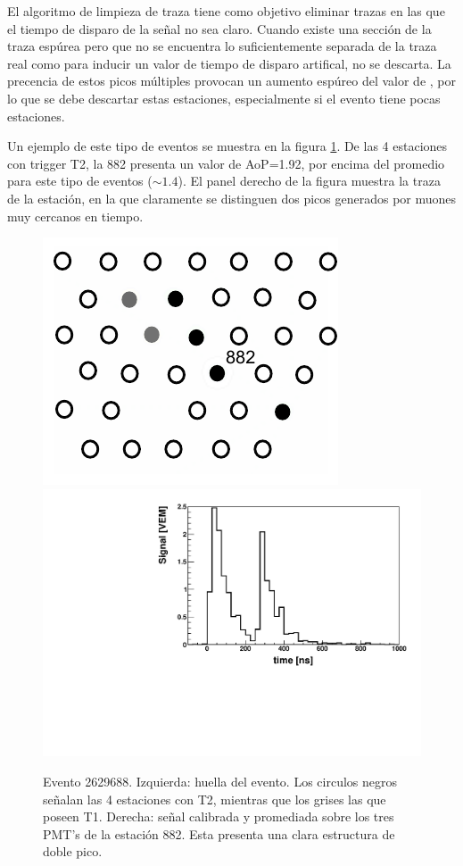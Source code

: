 	El algoritmo de limpieza de traza tiene como objetivo eliminar trazas en las que el tiempo de disparo de la señal no sea claro. 
	Cuando existe una sección de la traza espúrea pero que no se encuentra lo suficientemente separada de la traza real como para inducir un valor de tiempo de disparo artifical, no se descarta.
	La precencia de estos picos múltiples provocan un aumento espúreo del valor de \aop{}, por lo que se debe descartar estas estaciones, especialmente si el evento tiene pocas estaciones.
	
	Un ejemplo de este tipo de eventos se muestra en la figura \ref{fig:doublePeakEvent}.
	De las 4 estaciones con trigger T2, la 882 presenta un valor de AoP=1.92, por encima del promedio para este tipo de eventos ($\sim1.4$). 
	El panel derecho de la figura muestra la traza de la estación, en la que claramente se distinguen dos picos generados por muones muy cercanos en tiempo.
	\begin{figure}[ht]
	\begin{center}
	\includegraphics[height=0.35\textwidth]{fig/seleccionAuger/2629688_nice}
	\hfill
	\includegraphics[height=0.35\textwidth]{fig/seleccionAuger/ev2629688_pmtAvg_anode}
	\caption{Evento 2629688. Izquierda: huella del evento. Los circulos negros señalan las 4 estaciones con T2, mientras que los grises las que poseen T1. Derecha: señal calibrada y promediada sobre los tres PMT's de la estación 882. Esta presenta una clara estructura de doble pico. }
	\label{fig:doublePeakEvent}
	\end{center}
	\end{figure}
	
